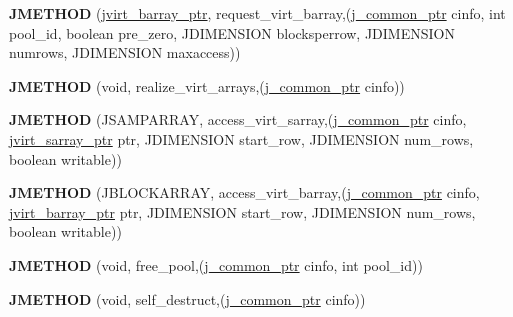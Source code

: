 \begin{DoxyCompactItemize}
\item 
\mbox{\label{structjpeg__memory__mgr_a975788a0a9a41972f2ff64736ee5751c}} 
{\bfseries J\+M\+E\+T\+H\+OD} (\hyperlink{structjvirt__barray__control}{jvirt\+\_\+barray\+\_\+ptr}, request\+\_\+virt\+\_\+barray,(\hyperlink{structjpeg__common__struct}{j\+\_\+common\+\_\+ptr} cinfo, int pool\+\_\+id, boolean pre\+\_\+zero, J\+D\+I\+M\+E\+N\+S\+I\+ON blocksperrow, J\+D\+I\+M\+E\+N\+S\+I\+ON numrows, J\+D\+I\+M\+E\+N\+S\+I\+ON maxaccess))
\item 
\mbox{\label{structjpeg__memory__mgr_a35e7cf4ab5070a3f1f9dbda939e5ea75}} 
{\bfseries J\+M\+E\+T\+H\+OD} (void, realize\+\_\+virt\+\_\+arrays,(\hyperlink{structjpeg__common__struct}{j\+\_\+common\+\_\+ptr} cinfo))
\item 
\mbox{\label{structjpeg__memory__mgr_a4719a214970e8b5a9816c8124caa4c20}} 
{\bfseries J\+M\+E\+T\+H\+OD} (J\+S\+A\+M\+P\+A\+R\+R\+AY, access\+\_\+virt\+\_\+sarray,(\hyperlink{structjpeg__common__struct}{j\+\_\+common\+\_\+ptr} cinfo, \hyperlink{structjvirt__sarray__control}{jvirt\+\_\+sarray\+\_\+ptr} ptr, J\+D\+I\+M\+E\+N\+S\+I\+ON start\+\_\+row, J\+D\+I\+M\+E\+N\+S\+I\+ON num\+\_\+rows, boolean writable))
\item 
\mbox{\label{structjpeg__memory__mgr_a27ee820a8888f09c8c62eed62bb0e556}} 
{\bfseries J\+M\+E\+T\+H\+OD} (J\+B\+L\+O\+C\+K\+A\+R\+R\+AY, access\+\_\+virt\+\_\+barray,(\hyperlink{structjpeg__common__struct}{j\+\_\+common\+\_\+ptr} cinfo, \hyperlink{structjvirt__barray__control}{jvirt\+\_\+barray\+\_\+ptr} ptr, J\+D\+I\+M\+E\+N\+S\+I\+ON start\+\_\+row, J\+D\+I\+M\+E\+N\+S\+I\+ON num\+\_\+rows, boolean writable))
\item 
\mbox{\label{structjpeg__memory__mgr_ad4c16a945a0405cc2389c4a2c61bde1d}} 
{\bfseries J\+M\+E\+T\+H\+OD} (void, free\+\_\+pool,(\hyperlink{structjpeg__common__struct}{j\+\_\+common\+\_\+ptr} cinfo, int pool\+\_\+id))
\item 
\mbox{\label{structjpeg__memory__mgr_a5ff35cbfa35e6794733b42fb37e9509d}} 
{\bfseries J\+M\+E\+T\+H\+OD} (void, self\+\_\+destruct,(\hyperlink{structjpeg__common__struct}{j\+\_\+common\+\_\+ptr} cinfo))
\end{DoxyCompactItemize}
